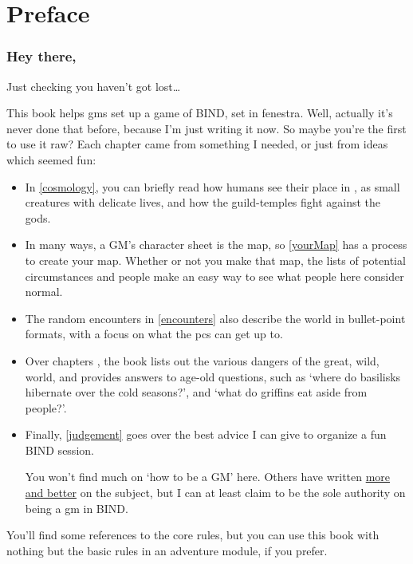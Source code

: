 \chapter{Preface}

\begin{multicols}{2}

\subsection{Hey there,}

Just checking you haven't got lost\ldots

This book helps \glspl{gm} set up a game of BIND, set in \gls{fenestra}.
Well, actually it's never done that before, because I'm just writing it now.
So maybe you're the first to use it raw?
Each chapter came from something I needed, or just from ideas which seemed fun:

\begin{itemize}
  \item
  In \autoref{cosmology}, you can briefly read how humans see their place in , as small creatures with delicate lives, and how the guild-temples fight against the gods.
  \item
  In many ways, a GM's character sheet is the map, so \autoref{yourMap} has a process to create your map.
  Whether or not you make that map, the lists of potential circumstances and people make an easy way to see what people here consider normal.
  \item
  The random encounters in \autoref{encounters} also describe the world in bullet-point formats, with a focus on what the \glspl{pc} can get up to.
  \item
  Over chapters , the book lists out the various dangers of the great, wild, world, and provides answers to age-old questions, such as `where do basilisks hibernate over the cold seasons?', and `what do griffins eat aside from people?'.
  \item
  Finally, \autoref{judgement} goes over the best advice I can give to organize a fun BIND session.

  You won't find much on `how to be a GM' here.
  Others have written \href{https://theangrygm.com}{more and better} on the subject, but I can at least claim to be the sole authority on being a \gls{gm} in BIND.

\end{itemize}

You'll find some references to the core rules, but you can use this book with nothing but the basic rules in an adventure module, if you prefer.


\end{multicols}
